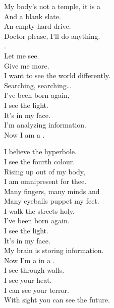 My body's not a temple, it is a  \\
And a blank slate. \\
An empty hard drive. \\
Doctor please, I'll do anything. \\
. \\
Let me see. \\
Give me more. \\
I want to see the world differently. \\

Searching, searching… \\

I've been born again, \\
I see the light. \\
It's in my face. \\
I'm analyzing information. \\
Now I am a . \\





I believe the hyperbole. \\
I see the fourth colour. \\

Rising up out of my body, \\
I am omnipresent for thee. \\
Many fingers, many minds and \\
Many eyeballs puppet my feet. \\
I walk the streets holy. \\

I've been born again. \\
I see the light. \\
It's in my face. \\
My brain is storing information. \\
Now I'm a  in a . \\

I see through walls. \\
I see your heat. \\
I can see your terror. \\
With sight you can see the future. \\


